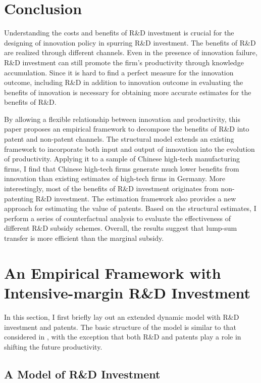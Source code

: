 \documentclass[11pt]{article}
\begin{document}
\section{Conclusion}
Understanding the costs and benefits of R\&D investment is crucial for the designing of innovation policy in spurring R\&D investment. The benefits of R\&D are realized through different channels. Even in the presence of innovation failure, R\&D investment can still promote the firm's productivity through knowledge accumulation. Since it is hard to find a perfect measure for the innovation outcome, including R\&D in addition to innovation outcome in evaluating the benefits of innovation is necessary for obtaining more accurate estimates for the benefits of R\&D. 

By allowing a flexible relationship between innovation and productivity, this paper proposes an empirical framework to decompose the benefits of R\&D into patent and non-patent channels. The structural model extends an existing framework to incorporate both input and output of innovation into the evolution of productivity. Applying it to a sample of Chinese high-tech manufacturing firms, I find that Chinese high-tech firms generate much lower benefits from innovation than existing estimates of high-tech firms in Germany. More interestingly, most of the benefits of R\&D investment originates from non-patenting R\&D investment. The estimation framework also provides a new approach for estimating the value of patents. Based on the structural estimates, I perform a series of counterfactual analysis to evaluate the effectiveness of different R\&D subsidy schemes. Overall, the results suggest that lump-sum transfer is more efficient than the marginal subsidy. 



\clearpage 
\appendix 
\appendixpage 
\section{An Empirical Framework with Intensive-margin R\&D Investment}
In this section, I first briefly lay out an extended dynamic model with R\&D investment and patents. The basic structure of the model is similar to that considered in \cite{Awetal.2011,Doraszelski2013,Peters2016, Peters2017rand}, with the exception that both R\&D and patents play a role in shifting the future productivity. 

\subsection{A Model of R\&D Investment}
\end{document}
